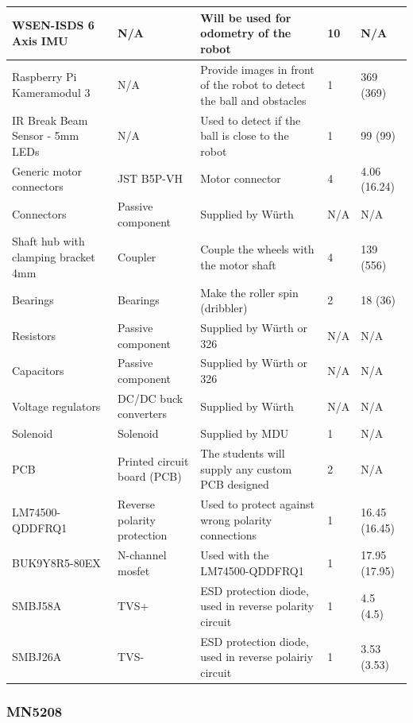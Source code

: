 \documentclass[a4paper,8pt]{article}
\begin{document}
\begin{small}
\begin{longtable}{|p{3cm}|p{3cm}|p{3cm}|p{1cm}|p{3cm}| }
      WSEN-ISDS 6 Axis IMU & N/A & Will be used for odometry of the robot & 10 & N/A\\ \hline 
      Raspberry Pi Kameramodul 3 & N/A & Provide images in front of the robot to detect the ball and obstacles & 1 & 369 (369) \\ \hline 
      IR Break Beam Sensor - 5mm LEDs & N/A & Used to detect if the ball is close to the robot & 1 & 99 (99) \\ \hline 
      Generic motor connectors & JST B5P-VH & Motor connector & 4 & 4.06 (16.24) \\ \hline
      Connectors & Passive component & Supplied by Würth & N/A & N/A \\ \hline 
      Shaft hub with clamping bracket 4mm & Coupler & Couple the wheels with the motor shaft & 4 & 139 (556) \\ \hline 
      Bearings & Bearings & Make the roller spin (dribbler) & 2 & 18 (36)\\ \hline
      Resistors & Passive component & Supplied by Würth or 326 & N/A & N/A \\ \hline 
      Capacitors & Passive component & Supplied by Würth or 326 & N/A & N/A \\ \hline 
      Voltage regulators & DC/DC buck converters & Supplied by Würth & N/A & N/A \\ \hline 
      Solenoid & Solenoid & Supplied by MDU & 1 & N/A \\ \hline 
      PCB & Printed circuit board (PCB) & The students will supply any custom PCB designed & 2 & N/A\\ \hline 
      LM74500\break-QDDFRQ1 & Reverse polarity protection & Used to protect against wrong polarity connections & 1 & 16.45 (16.45) \\ \hline 
      BUK9Y8R5-80EX & N-channel mosfet & Used with the LM74500\break-QDDFRQ1 & 1 & 17.95 (17.95) \\ \hline 
      SMBJ58A & TVS+ & ESD protection diode, used in reverse polarity circuit & 1 & 4.5 (4.5) \\ \hline 
      SMBJ26A & TVS- & ESD protection diode, used in reverse polairiy circuit & 1 & 3.53 (3.53) \\ \hline

    \end{longtable}
  \end{small}
  \subsubsection{MN5208}
\end{document}
